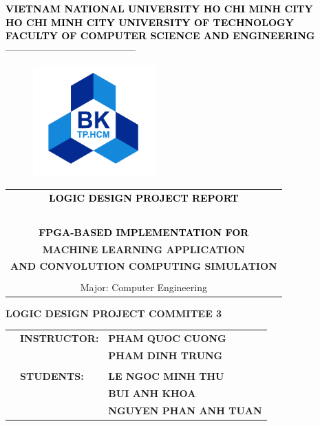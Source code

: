 \documentclass[a4paper, 12pt]{report}
\begin{document}
\begin{titlepage}
\begin{center}
\textcolor{black}{\textbf{\large VIETNAM NATIONAL UNIVERSITY HO CHI MINH CITY}} \\
\textcolor{black}{\textbf{ \large HO CHI MINH CITY UNIVERSITY OF TECHNOLOGY}}\\
\textcolor{black}{\textbf{\large FACULTY OF COMPUTER SCIENCE AND ENGINEERING}}\\
-----------------------------------------
\end{center}

\vspace{1cm}

\begin{figure}[h!]
\begin{center}
\includegraphics[width=4.7cm]{3_Logo_BK.png}
\end{center}
\end{figure}

\vspace{0.7cm}


\begin{center}
\begin{tabular}{c}
	\multicolumn{1}{c}{\textcolor{black}{\textbf{{\large LOGIC DESIGN PROJECT REPORT}}}}\\
    ~~\\
    \textbf{{\textcolor{black}{\LARGE FPGA-BASED IMPLEMENTATION FOR }}}\\
    
    \textbf{\LARGE MACHINE LEARNING APPLICATION}\\
    \textbf{\LARGE AND CONVOLUTION COMPUTING SIMULATION}\\
    \\
    \large Major: Computer Engineering
\end{tabular}
\end{center}

\vspace{1.2cm}
\hspace{5.7cm}\textbf{LOGIC DESIGN PROJECT COMMITEE 3}
\begin{table}[h]
\begin{tabular}{rll}
\hspace{5cm}
& \textbf{INSTRUCTOR:} &\textbf{PHAM QUOC CUONG}\\
& & \textbf{PHAM DINH TRUNG}\\
\\
& \textbf{STUDENTS:} & \textbf{LE NGOC MINH THU }\\ 
& &\textbf{BUI ANH KHOA}\\
& &\textbf{NGUYEN PHAN ANH TUAN }


\end{tabular}
\end{table}
\end{titlepage}
\end{document}
